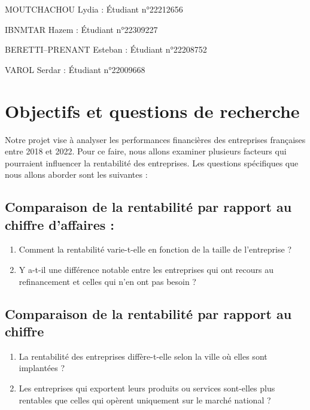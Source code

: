 \documentclass[mstat,12pt]{unswthesis}
\begin{document}
MOUTCHACHOU Lydia : Étudiant n°22212656

IBNMTAR Hazem : Étudiant n°22309227

BERETTI--PRENANT Esteban : Étudiant n°22208752

VAROL Serdar : Étudiant n°22009668

\bigskip

\section{Objectifs et questions de
recherche}\label{objectifs-et-questions-de-recherche}

Notre projet vise à analyser les performances financières des
entreprises françaises entre 2018 et 2022. Pour ce faire, nous allons
examiner plusieurs facteurs qui pourraient influencer la rentabilité des
entreprises. Les questions spécifiques que nous allons aborder sont les
suivantes :

\subsection{\texorpdfstring{\textbf{Comparaison de la rentabilité par
rapport au chiffre d'affaires
:}}{Comparaison de la rentabilité par rapport au chiffre d'affaires :}}\label{comparaison-de-la-rentabilituxe9-par-rapport-au-chiffre-daffaires}

\begin{enumerate}
\def\labelenumi{\alph{enumi}.}
\item
  Comment la rentabilité varie-t-elle en fonction de la taille de
  l'entreprise ?
\item
  Y a-t-il une différence notable entre les entreprises qui ont recours
  au refinancement et celles qui n'en ont pas besoin ?
\end{enumerate}

\subsection{\texorpdfstring{\textbf{Comparaison de la rentabilité par
rapport au
chiffre}}{Comparaison de la rentabilité par rapport au chiffre}}\label{comparaison-de-la-rentabilituxe9-par-rapport-au-chiffre}

\begin{enumerate}
\def\labelenumi{\alph{enumi}.}
\item
  La rentabilité des entreprises diffère-t-elle selon la ville où elles
  sont implantées ?
\item
  Les entreprises qui exportent leurs produits ou services sont-elles
  plus rentables que celles qui opèrent uniquement sur le marché
  national ?
\end{enumerate}
\end{document}
